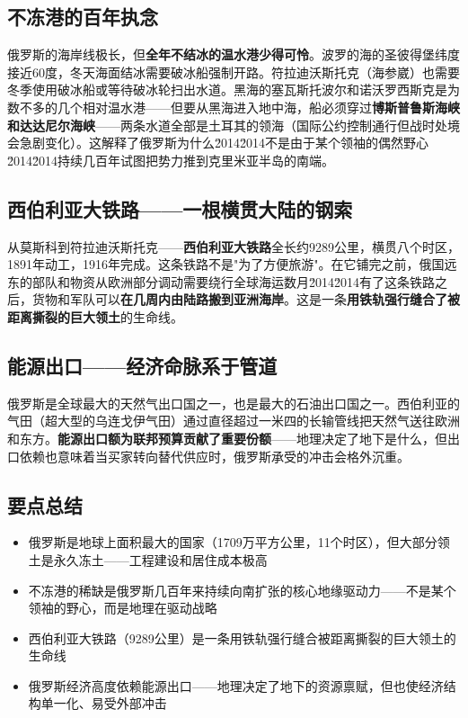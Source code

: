 \documentclass[a4paper,12pt]{ctexart}
\begin{document}
\subsection*{不冻港的百年执念}

俄罗斯的海岸线极长，但\textbf{全年不结冰的温水港少得可怜}。波罗的海的圣彼得堡纬度接近60度，冬天海面结冰需要破冰船强制开路。符拉迪沃斯托克（海参崴）也需要冬季使用破冰船或等待破冰轮扫出水道。黑海的塞瓦斯托波尔和诺沃罗西斯克是为数不多的几个相对温水港——但要从黑海进入地中海，船必须穿过\textbf{博斯普鲁斯海峡和达达尼尔海峡}——两条水道全部是土耳其的领海（国际公约控制通行但战时处境会急剧变化）。这解释了俄罗斯为什么\u2014\u2014不是由于某个领袖的偶然野心\u2014\u2014持续几百年试图把势力推到克里米亚半岛的南端。

\subsection*{西伯利亚大铁路——一根横贯大陆的钢索}

从莫斯科到符拉迪沃斯托克——\textbf{西伯利亚大铁路}全长约9289公里，横贯八个时区，1891年动工，1916年完成。这条铁路不是"为了方便旅游"。在它铺完之前，俄国远东的部队和物资从欧洲部分调动需要绕行全球海运数月\u2014\u2014有了这条铁路之后，货物和军队可以\textbf{在几周内由陆路搬到亚洲海岸}。这是一条\textbf{用铁轨强行缝合了被距离撕裂的巨大领土}的生命线。

\subsection*{能源出口——经济命脉系于管道}

俄罗斯是全球最大的天然气出口国之一，也是最大的石油出口国之一。西伯利亚的气田（超大型的乌连戈伊气田）通过直径超过一米四的长输管线把天然气送往欧洲和东方。\textbf{能源出口额为联邦预算贡献了重要份额}——地理决定了地下是什么，但出口依赖也意味着当买家转向替代供应时，俄罗斯承受的冲击会格外沉重。

\subsection*{要点总结}
\begin{itemize}
  \item 俄罗斯是地球上面积最大的国家（1709万平方公里，11个时区），但大部分领土是永久冻土——工程建设和居住成本极高
  \item 不冻港的稀缺是俄罗斯几百年来持续向南扩张的核心地缘驱动力——不是某个领袖的野心，而是地理在驱动战略
  \item 西伯利亚大铁路（9289公里）是一条用铁轨强行缝合被距离撕裂的巨大领土的生命线
  \item 俄罗斯经济高度依赖能源出口——地理决定了地下的资源禀赋，但也使经济结构单一化、易受外部冲击
\end{itemize}
\end{document}
